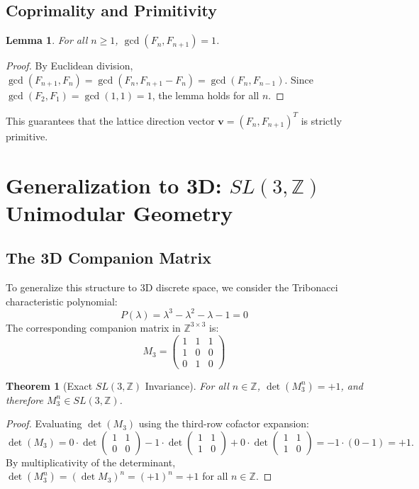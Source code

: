 \documentclass{article}
\newtheorem{theorem}{Theorem}
\newtheorem{lemma}{Lemma}
\theoremstyle{remark}
\begin{document}
\subsection{Coprimality and Primitivity}

\begin{lemma}
For all $n \ge 1$, $\gcd(F_n, F_{n+1}) = 1$.
\end{lemma}
\begin{proof}
By Euclidean division, $\gcd(F_{n+1}, F_n) = \gcd(F_n, F_{n+1} - F_n) = \gcd(F_n, F_{n-1})$. Since $\gcd(F_2, F_1) = \gcd(1, 1) = 1$, the lemma holds for all $n$.
\end{proof}
This guarantees that the lattice direction vector $\mathbf{v} = (F_n, F_{n+1})^T$ is strictly primitive.

\section{Generalization to 3D: $SL(3,\mathbb{Z})$ Unimodular Geometry}

\subsection{The 3D Companion Matrix}

To generalize this structure to 3D discrete space, we consider the Tribonacci characteristic polynomial:
\[
P(\lambda) = \lambda^3 - \lambda^2 - \lambda - 1 = 0
\]
The corresponding companion matrix in $\mathbb{Z}^{3 \times 3}$ is:
\[
M_3 = \begin{pmatrix} 1 & 1 & 1 \\ 1 & 0 & 0 \\ 0 & 1 & 0 \end{pmatrix}
\]

\begin{theorem}[Exact $SL(3,\mathbb{Z})$ Invariance]
For all $n \in \mathbb{Z}$, $\det(M_3^n) = +1$, and therefore $M_3^n \in SL(3,\mathbb{Z})$.
\end{theorem}
\begin{proof}
Evaluating $\det(M_3)$ using the third-row cofactor expansion:
\[
\det(M_3) = 0 \cdot \det\begin{pmatrix} 1 & 1 \\ 0 & 0 \end{pmatrix} - 1 \cdot \det\begin{pmatrix} 1 & 1 \\ 1 & 0 \end{pmatrix} + 0 \cdot \det\begin{pmatrix} 1 & 1 \\ 1 & 0 \end{pmatrix} = -1 \cdot (0 - 1) = +1.
\]
By multiplicativity of the determinant, $\det(M_3^n) = (\det M_3)^n = (+1)^n = +1$ for all $n \in \mathbb{Z}$.
\end{proof}
\end{document}

